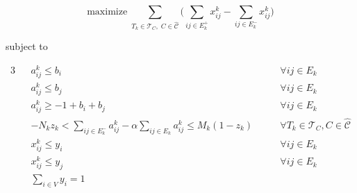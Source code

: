 \begin{equation}
	\label{eq:d-ecp-objective}
	\text{maximize} \; \sum_{ T_{k} \in \mathcal{T}_{C}, \; C \in
		\mathcal{\hat{C}} } \big( \sum^{}_{ij \in E^+_k} x_{ij}
	^{k} - \sum_{ij \in E^-_k} x_{ij} ^{k} \big)
\end{equation}
\begin{center} subject to \end{center}
\begin{alignat}{3}
	\label{eq:d-ecp-a-ij-l-bi}
	                                           &                                           & a_{ij}^{k} \leq b_{i} \quad\quad                                              & \forall ij \in E_k                        \\
	\label{eq:d-ecp-a-ij-l-bj}
	                                           &                                           & a_{ij}^{k} \leq b_{j} \quad\quad                                              & \forall ij \in E_k                        \\
	\label{eq:d-ecp-a-ij-g-ijk}
	                                           &                                           & a _{ij} ^{k} \geq - 1 + b_i + b_j \quad\quad                                  & \forall ij \in E_k                        \\
	\label{eq:d-ecp-alpha-constraint}
	                                           &                                           & -N_{k} z_k < \sum^{}_{ij \in E^-_k} a_{ij}^{k}  - \alpha \sum^{}_{ij \in E_k}
	a_{ij} ^{k}  \leq M_k (1 - z_k) \quad\quad & \forall T_{k} \in \mathcal{T} _{C}, C \in
	\hat{\mathcal{C}}                                                                                                                                                                                                  \\
	\label{eq:d-ecp-edge-charikar1}
	                                           &                                           & x _{ij}^{k}  \leq y_i \quad\quad                                              & \forall ij \in E_{k}                      \\
	\label{eq:d-ecp-edge-charikar2}
	                                           &                                           & x _{ij} ^{k} \leq y_j \quad\quad                                              & \forall ij \in E_k                        \\
	\label{eq:d-ecp-vertex-charikar1}
	                                           &
	                                           & \sum^{}_{i \in V} y_i = 1

\end{alignat}

